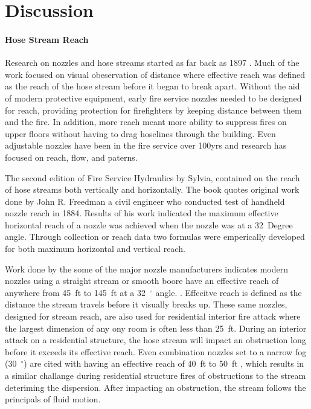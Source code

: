 \documentclass[12pt,oneside]{book}
\begin{document}
\chapter{Discussion}

\subsubsection{Hose Stream Reach}
Research on nozzles and hose streams started as far back as 1897 \cite{CHICAGO_TRIBUNE:1339:a}. Much of the work focused on visual obeservation of distance where effective reach was defined as the reach of the hose stream before it began to break apart. Without the aid of modern protective equipment, early fire service nozzles needed to be designed for reach, providing protection for firefighters by keeping distance between them and the fire. In addition, more reach meant more ability to suppress fires on upper floors without having to drag hoselines through the building. Even adjustable nozzles have been in the fire service over 100yrs \cite{PALMER:1878} and research has focused on reach, flow, and paterns. 

The second edition of Fire Service Hydraulics by Sylvia, contained on the reach of hose streams both vertically and horizontally. The book quotes original work done by John R. Freedman a civil engineer who conducted test of handheld nozzle reach in 1884. Results of his work indicated the maximum effective horizontal reach of a nozzle was achieved when the nozzle was at a 32~Degree angle. Through collection or reach data two formulas were emperically developed for both maximum horizontal and vertical reach. \cite{SYLVIA:1970}

Work done by the some of the major nozzle manufacturers indicates modern nozzles using a straight stream or smooth boore have an effective reach of anywhere from 45~ft to 145~ft at a 32~$^\circ$ angle.  \cite{TFT_Reach} \cite{Elkhart_Reach} \cite{Akron_Reach}. Effecitve reach is defined as the distance the stream travels before it visually breaks up. These same nozzles, designed for stream reach, are also used for residential interior fire attack where the largest dimension of any ony room is often less than 25~ft. During an interior attack on a residential structure, the hose stream will impact an obstruction long before it exceeds its effective reach.  Even combination nozzles set to a narrow fog (30~$^\circ$) are cited with having an effective reach of 40~ft to 50~ft \cite{Elkhart_Reach}, which results in a similar challange during residential structure fires of obstructions to the stream deteriming the dispersion. After impacting an obstruction, the stream follows the principals of fluid motion.
\end{document}
